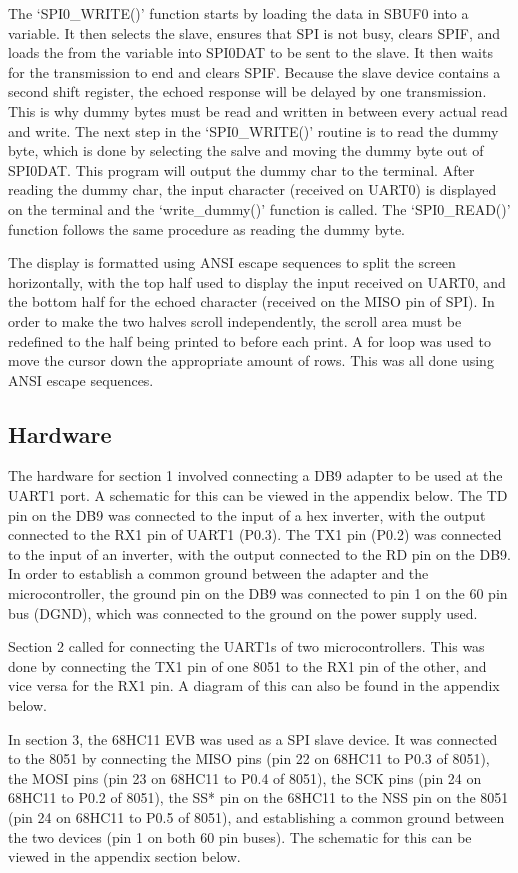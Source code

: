 \documentclass[12pt]{article}
\begin{document}
The `SPI0\_WRITE()' function starts by loading the data in SBUF0 into a variable. It then selects the slave, ensures that SPI is not busy, clears SPIF, and loads the from the variable into SPI0DAT to be sent to the slave. It then waits for the transmission to end and clears SPIF. Because the slave device contains a second shift register, the echoed response will be delayed by one transmission. This is why dummy bytes must be read and written in between every actual read and write. The next step in the `SPI0\_WRITE()' routine is to read the dummy byte, which is done by selecting the salve and moving the dummy byte out of SPI0DAT. This program will output the dummy char to the terminal. After reading the dummy char, the input character (received on UART0) is displayed on the terminal and the `write\_dummy()' function is called. The `SPI0\_READ()' function follows the same procedure as reading the dummy byte.

The display is formatted using ANSI escape sequences to split the screen horizontally, with the top half used to display the input received on UART0, and the bottom half for the echoed character (received on the MISO pin of SPI). In order to make the two halves scroll independently, the scroll area must be redefined to the half being printed to before each print. A for loop was used to move the cursor down the appropriate amount of rows. This was all done using ANSI escape sequences.
\subsection{Hardware}
The hardware for section 1 involved connecting a DB9 adapter to be used at the UART1 port. A schematic for this can be viewed in the appendix below. The TD pin on the DB9 was connected to the input of a hex inverter, with the output connected to the RX1 pin of UART1 (P0.3). The TX1 pin (P0.2) was connected to the input of an inverter, with the output connected to the RD pin on the DB9. In order to establish a common ground between the adapter and the microcontroller, the ground pin on the DB9 was connected to pin 1 on the 60 pin bus (DGND), which was connected to the ground on the power supply used. 
 
Section 2 called for connecting the UART1s of two microcontrollers. This was done by connecting the TX1 pin of one 8051 to the RX1 pin of the other, and vice versa for the RX1 pin. A diagram of this can also be found in the appendix below.

In section 3, the 68HC11 EVB was used as a SPI slave device. It was connected to the 8051 by connecting the MISO pins (pin 22 on 68HC11 to P0.3 of 8051), the MOSI pins (pin 23 on 68HC11 to P0.4 of 8051), the SCK pins (pin 24 on 68HC11 to P0.2 of 8051), the SS* pin on the 68HC11 to the NSS pin on the 8051 (pin 24 on 68HC11 to P0.5 of 8051), and establishing a common ground between the two devices (pin 1 on both 60 pin buses). The schematic for this can be viewed in the appendix section below. 
\end{document}
